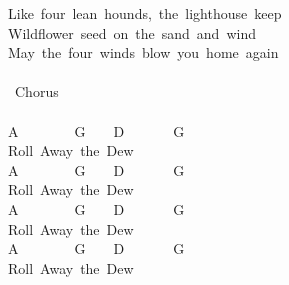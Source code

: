 {Like\ four\ lean\ hounds,\ the\ lighthouse\ keep\\
Wildflower\ seed\ on\ the\ sand\ and\ wind\\
May\ the\ four\ winds\ blow\ you\ home\ again\\
\\
\lbrack\ Chorus\rbrack\\
\\
A\ \ \ \ \ \ \ \ G\ \ \ \ D\ \ \ \ \ \ \ G\\
Roll\ Away\ the\ Dew\\
A\ \ \ \ \ \ \ \ G\ \ \ \ D\ \ \ \ \ \ \ G\\
Roll\ Away\ the\ Dew\\
A\ \ \ \ \ \ \ \ G\ \ \ \ D\ \ \ \ \ \ \ G\\
Roll\ Away\ the\ Dew\\
A\ \ \ \ \ \ \ \ G\ \ \ \ D\ \ \ \ \ \ \ G\\
Roll\ Away\ the\ Dew\ }
